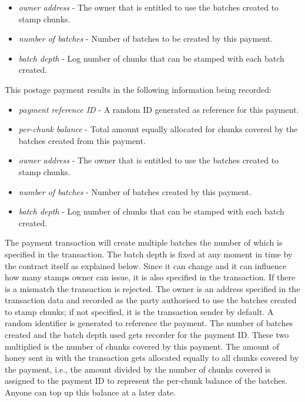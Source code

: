 \begin{itemize}
\item \emph{owner address} - The owner that is entitled to use the batches created to stamp chunks.
\item \emph{number of batches} - Number of batches to be created by this payment.
\item \emph{batch depth} - Log number of chunks that can be stamped with each batch created.
\end{itemize}

This postage payment results in the following information being recorded:

\begin{itemize}
\item \emph{payment reference ID} - A random ID generated as reference for this payment.
\item \emph{per-chunk balance} - Total amount equally allocated for chunks covered by the batches created from this payment.
\item \emph{owner address} - The owner that is entitled to use the batches created to stamp chunks.
\item \emph{number of batches} - Number of batches created by this payment.
\item \emph{batch depth} - Log number of chunks that can be stamped with each batch created.
\end{itemize}

The payment transaction will create multiple batches the number of which is specified in the transaction. The batch depth is fixed at any moment in time by the contract itself as explained below. Since it can change and it can influence how many stamps owner can issue, it is also specified in the transaction. If there is a mismatch the transaction is rejected.
The owner is an address specified in the transaction data and recorded as the party authorised to use the batches created to stamp chunks; if not specified, it is the transaction sender by default. A random identifier is generated to reference the payment. The number of batches created and the batch depth used gets recorder for the payment ID. These two multiplied is the number of chunks covered by this payment. The amount of honey sent in with the transaction gets allocated equally to all chunks covered by the payment, i.e., the amount divided by the number of chunks covered is assigned to the payment ID to represent the per-chunk balance of the batches. Anyone can top up this balance at a later date. 

